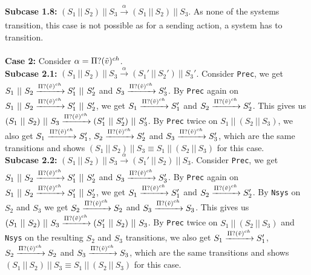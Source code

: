 \indent \textbf{Subcase 1.8: }$(S_1 \ || \ S_2)\ ||\ S_3 \xrightarrow[]{\alpha} (S_1 \ || \ S_2)\ ||\ S_3$. As none of the systems transition, this case is not possible as for a sending action, a system has to transition.\\
\\
\textbf{Case 2: } Consider $\alpha = \Pi ? (\Tilde{v})^{ch}$.\\
\indent \textbf{Subcase 2.1: }$(S_1 \ || \ S_2)\ ||\ S_3 \xrightarrow[]{\alpha} (S_1' \ || \ S_2')\ ||\ S_3'$. Consider \texttt{Prec}, we get $S_1 \ || \ S_2 \xrightarrow[]{\Pi ? (\Tilde{v})^{ch}} S_1' \ || \ S_2'$ and $S_3 \xrightarrow[]{\Pi ? (\Tilde{v})^{ch}} S_3'$. By \texttt{Prec} again on $S_1 \ || \ S_2 \xrightarrow[]{\Pi ? (\Tilde{v})^{ch}} S_1' \ || \ S_2'$, we get $S_1 \xrightarrow[]{\Pi ? (\Tilde{v})^{ch}} S_1'$ and $S_2 \xrightarrow[]{\Pi ? (\Tilde{v})^{ch}} S_2'$. This gives us $(S_1 \ || \ S_2)\ ||\ S_3 \xrightarrow[]{\Pi ? (\Tilde{v})^{ch}} (S_1' \ || \ S_2')\ ||\ S_3'$. By \texttt{Prec} twice on $S_1 \ ||\ (S_2 \ || \ S_3)$, we also get $S_1 \xrightarrow[]{\Pi ? (\Tilde{v})^{ch}} S_1'$, $S_2 \xrightarrow[]{\Pi ? (\Tilde{v})^{ch}} S_2'$ and $S_3 \xrightarrow[]{\Pi ? (\Tilde{v})^{ch}} S_3'$, which are the same transitions and shows $(S_1 \ ||\ S_2 )\ || \ S_3 \equiv S_1 \ ||\ (S_2 \ || \ S_3)$ for this case.\\
\indent \textbf{Subcase 2.2: }$(S_1 \ || \ S_2)\ ||\ S_3 \xrightarrow[]{\alpha} (S_1' \ || \ S_2)\ ||\ S_3$. Consider \texttt{Prec}, we get $S_1 \ || \ S_2 \xrightarrow[]{\Pi ? (\Tilde{v})^{ch}} S_1' \ || \ S_2'$ and $S_3 \xrightarrow[]{\Pi ? (\Tilde{v})^{ch}} S_3'$. By \texttt{Prec} again on $S_1 \ || \ S_2 \xrightarrow[]{\Pi ? (\Tilde{v})^{ch}} S_1' \ || \ S_2'$, we get $S_1 \xrightarrow[]{\Pi ? (\Tilde{v})^{ch}} S_1'$ and $S_2 \xrightarrow[]{\Pi ? (\Tilde{v})^{ch}} S_2'$. By \texttt{Nsys} on $S_2$ and $S_3$ we get $S_2 \xrightarrow[]{\Pi ? (\Tilde{v})^{ch}} S_2$ and $S_3 \xrightarrow[]{\Pi ? (\Tilde{v})^{ch}} S_3$. This gives us $(S_1 \ || \ S_2)\ ||\ S_3 \xrightarrow[]{\Pi ? (\Tilde{v})^{ch}} (S_1' \ || \ S_2)\ ||\ S_3$. By \texttt{Prec} twice on $S_1 \ ||\ (S_2 \ || \ S_3)$ and \texttt{Nsys} on the resulting $S_2$ and $S_3$ transitions, we also get $S_1 \xrightarrow[]{\Pi ? (\Tilde{v})^{ch}} S_1'$, $S_2 \xrightarrow[]{\Pi ? (\Tilde{v})^{ch}} S_2$ and $S_3 \xrightarrow[]{\Pi ? (\Tilde{v})^{ch}} S_3$, which are the same transitions and shows $(S_1 \ ||\ S_2 )\ || \ S_3 \equiv S_1 \ ||\ (S_2 \ || \ S_3)$ for this case.\\
